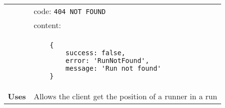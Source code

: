 \begin{adjustwidth}{1cm}{}
\begin{longtable}{|c|l|}
                  & code: \texttt{404 NOT FOUND} \\
                &                         content: \\
                & \begin{minipage}[t]{0.7\textwidth}
                    \begin{adjustwidth}{1.5cm}{}
                    \begin{verbatim}
    {
        success: false, 
        error: 'RunNotFound',
        message: 'Run not found'
    }
                    \end{verbatim}
                    \end{adjustwidth}
                  \end{minipage} \\
                  \hline
                \textbf{Uses} & Allows the client get the position of a runner in a run \\
                \hline
            \end{longtable}
        \end{adjustwidth}
    
